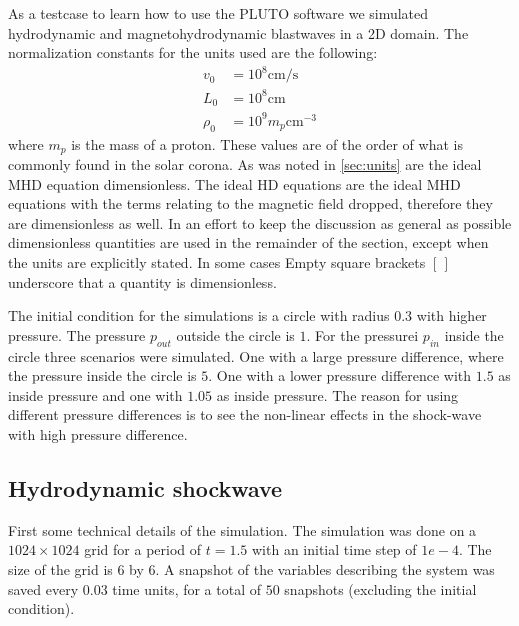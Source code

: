As a testcase to learn how to use the PLUTO software we simulated hydrodynamic and magnetohydrodynamic blastwaves in a 2D domain.
The normalization constants for the units used are the following:
\begin{align*}
	v_0 &= 10^8 \text{cm/s}\\
	L_0 &= 10^8 \text{cm}\\
	\rho_0 &= 10^9 m_p \text{cm}^{-3}
\end{align*}
where $m_p$ is the mass of a proton. These values are of the order of what is commonly found in the solar corona. 
As was noted in \cref{sec:units} are the ideal MHD equation dimensionless.
The ideal HD equations are the ideal MHD equations with the terms relating to the magnetic field dropped, therefore they are dimensionless as well.
In an effort to keep the discussion as general as possible dimensionless quantities are used in the remainder of the section, except when the units are explicitly stated.
In some cases Empty square brackets $[\,]$ underscore that a quantity is dimensionless.

The initial condition for the simulations is a circle with radius $0.3$ with higher pressure.
The pressure $p_{out}$ outside the circle is $1$. For the pressurei $p_{in}$ inside the circle three scenarios were simulated.
One with a large pressure difference, where the pressure inside the circle is $5$. One with a lower pressure difference with $1.5$ as inside pressure and one with $1.05$ as inside pressure.
The reason for using different pressure differences is to see the non-linear effects in the shock-wave with high pressure difference.

\subsection{Hydrodynamic shockwave}
First some technical details of the simulation.
The simulation was done on a $1024 \times 1024$ grid for a period of $t=1.5$ with an initial time step of $1e-4$.
The size of the grid is $6$ by $6$.
A snapshot of the variables describing the system was saved every $0.03$ time units, for a total of $50$ snapshots (excluding the initial condition).

